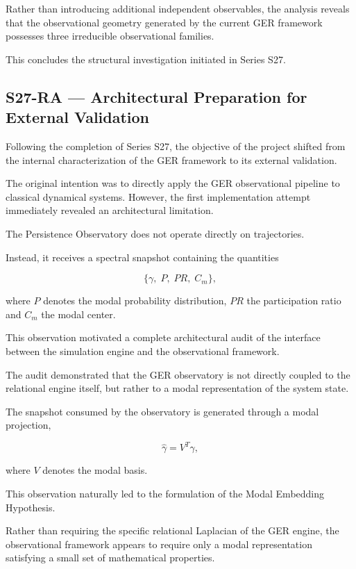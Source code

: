 Rather than introducing additional independent observables, the analysis reveals that the observational geometry generated by the current GER framework possesses three irreducible observational families.

This concludes the structural investigation initiated in Series S27.


\subsection{S27-RA --- Architectural Preparation for External Validation}

Following the completion of Series S27, the objective of the project shifted from the internal characterization of the GER framework to its external validation.

The original intention was to directly apply the GER observational pipeline to classical dynamical systems. However, the first implementation attempt immediately revealed an architectural limitation.

The Persistence Observatory does not operate directly on trajectories.

Instead, it receives a spectral snapshot containing the quantities

\[
\{
\gamma,\;
P,\;
PR,\;
C_m
\},
\]

where \(P\) denotes the modal probability distribution, \(PR\) the participation ratio and \(C_m\) the modal center.

This observation motivated a complete architectural audit of the interface between the simulation engine and the observational framework.

The audit demonstrated that the GER observatory is not directly coupled to the relational engine itself, but rather to a modal representation of the system state.

The snapshot consumed by the observatory is generated through a modal projection,

\[
\hat{\gamma}
=
V^{T}\gamma,
\]

where \(V\) denotes the modal basis.

This observation naturally led to the formulation of the Modal Embedding Hypothesis.

Rather than requiring the specific relational Laplacian of the GER engine, the observational framework appears to require only a modal representation satisfying a small set of mathematical properties.

